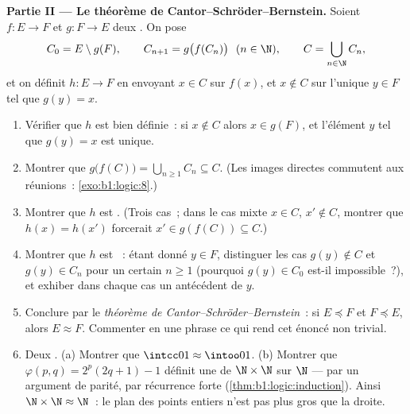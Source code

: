 \begin{problem}
\medskip
\noindent\textbf{Partie II --- Le théorème de
Cantor--Schröder--Bernstein.} Soient $f \colon E \to F$ et $g \colon F
\to E$ deux . On pose
\[
C_0 = E \setminus g(F), \qquad C_{n+1} = g\bigl(f(C_n)\bigr)
\ \ (n \in \N), \qquad C = \bigcup_{n \in \N} C_n,
\]
et on définit $h \colon E \to F$ en envoyant $x \in C$ sur $f(x)$, et
$x \notin C$ sur l'unique $y \in F$ tel que $g(y) = x$.
\begin{enumerate}[resume]
  \item Vérifier que $h$ est bien définie~: si $x \notin C$ alors $x \in
        g(F)$, et l'élément $y$ tel que $g(y) = x$ est unique.
  \item Montrer que $g\bigl(f(C)\bigr) = \bigcup_{n \geq 1} C_n
        \subseteq C$. (Les images directes commutent aux réunions~:
        \cref{exo:b1:logic:8}.)
  \item Montrer que $h$ est . (Trois cas~; dans le cas mixte
        $x \in C$, $x' \notin C$, montrer que $h(x) = h(x')$
        forcerait $x' \in g(f(C)) \subseteq C$.)
  \item Montrer que $h$ est ~: étant donné $y \in F$,
        distinguer les cas $g(y) \notin C$ et $g(y) \in C_n$ pour un
        certain $n \geq 1$ (pourquoi $g(y) \in C_0$ est-il
        impossible~?), et exhiber dans chaque cas un antécédent de $y$.
  \item Conclure par le \emph{théorème de
        Cantor--Schröder--Bernstein}~: si $E \preceq F$ et $F \preceq
        E$, alors $E \approx F$. Commenter en une phrase ce qui rend
        cet énoncé non trivial.
  \item Deux . (a) Montrer que $\intcc01 \approx \intoo01$.
        (b) Montrer que $\varphi(p, q) = 2^p(2q + 1) - 1$ définit une
         de $\N \times \N$ sur $\N$ ---  par un
        argument de parité,  par récurrence forte
        (\cref{thm:b1:logic:induction}). Ainsi $\N \times \N \approx
        \N$~: le plan des points entiers n'est pas plus gros que la
        droite.
\end{enumerate}


\end{problem}
